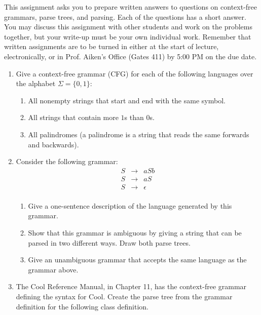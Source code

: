 \documentclass[11pt]{article}
\begin{document}

This assignment asks you to prepare written answers to questions on
context-free grammars, parse trees, and parsing.  Each of the questions has a short answer. 
You may discuss this assignment with other students and work on the problems
together, but your write-up must be your own individual work.  Remember
that written assignments are to be turned in either at the start of lecture, 
electronically, or in Prof. Aiken's Office (Gates 411) by 5:00 PM on the due date.

\bigskip

\begin{enumerate}
	\item Give a context-free grammar (CFG) for each of the following languages
		over the alphabet $\Sigma = \{0, 1\}$:
		\begin{enumerate}
			\item All nonempty strings that start and end with the same symbol.
			\item All strings that contain more $1$s than $0$s.
			\item All palindromes (a palindrome is a string that reads the same
				forwards and backwards).
		\end{enumerate}
	
	\item Consider the following grammar:
		\begin{eqnarray*}
			S & \rightarrow & aSb \\
			S & \rightarrow & aS \\
			S & \rightarrow & \epsilon \\
		\end{eqnarray*}
		\begin{enumerate}
			\item Give a one-sentence description of the language generated by this
			grammar.
			\item Show that this grammar is ambiguous by giving a string that can be
			parsed in two different ways.  Draw both parse trees.
			\item Give an unambiguous grammar that accepts the same language as the
			grammar above.
		\end{enumerate}
	
	\item The Cool Reference Manual, in Chapter 11, has the context-free
		grammar defining the syntax for Cool.  Create the parse tree from the
		grammar definition for the following class definition.
		

\end{enumerate}
\end{document}
